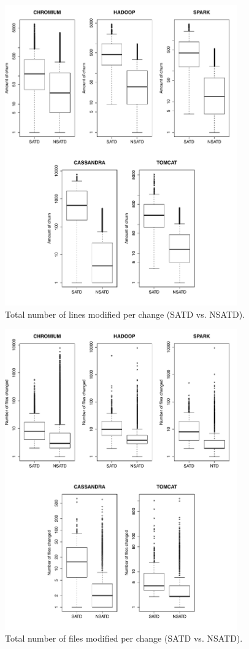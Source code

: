\begin{figure}[!hp]
	\centering
	\includegraphics[width=100mm]{figures/chapter3/churn_for_all_projects}
	\caption{Total number of lines modified per change (SATD vs. NSATD).}
	\label{figure:tlcpc}
\end{figure}




\begin{figure}[!hp]
	\centering
	\includegraphics[width=100mm]{figures/chapter3/number_of_files_changed_all_projects}
	\caption{Total number of files modified per change (SATD vs. NSATD).}
	\label{figure:tfcpc}
\end{figure}

